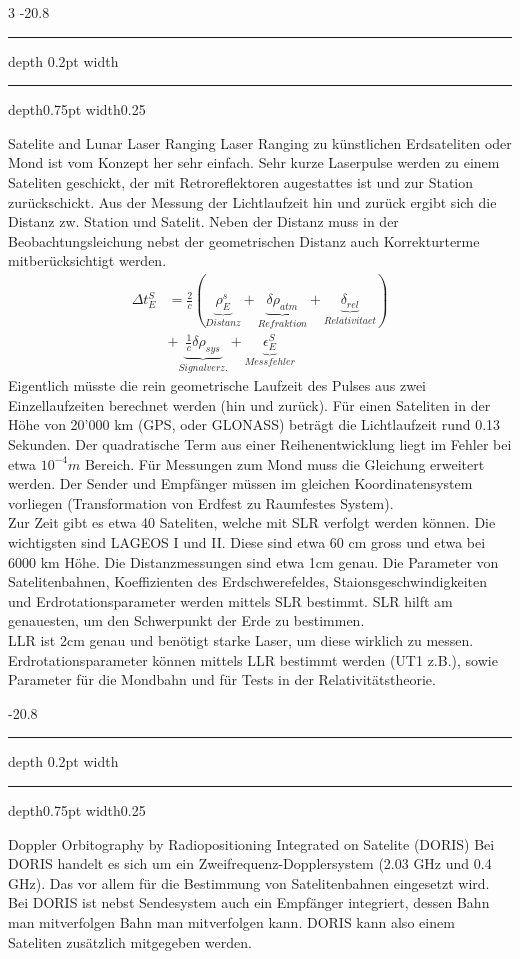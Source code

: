 \documentclass[9pt, landscape, fleqn]{scrartcl}
\makeatletter
\renewcommand{\subsection}{\@startsection{subsection}{1}{0mm}%
{-2\baselineskip}{0.8\baselineskip}%
{\hrule depth 0.2pt width\columnwidth\hrule depth0.75pt
width0.25\columnwidth\vspace*{1.2em}\large\bfseries\rmfamily}}
\makeatother
\begin{document}
\begin{multicols*}{3}
\subsection{Satelite and Lunar Laser Ranging}
Laser Ranging zu künstlichen Erdsateliten oder Mond ist vom Konzept her sehr einfach. Sehr kurze Laserpulse werden zu einem Sateliten geschickt, der mit Retroreflektoren augestattes ist und zur Station zurückschickt. Aus der Messung der Lichtlaufzeit hin und zurück ergibt sich die Distanz zw. Station und Satelit. Neben der Distanz muss in der Beobachtungsleichung nebst der geometrischen Distanz auch Korrekturterme mitberücksichtigt werden.
\begin{align*}
    \Delta t_E^S &= \frac{2}{c}\left( \underbrace{\rho_E^s}_{Distanz} + \underbrace{\delta \rho_{atm}}_{Refraktion} + \underbrace{\delta_{rel}}_{Relativitaet} \right)  \\
    &+ \underbrace{\frac{1}{c} \delta \rho_{sys}}_{Signalverz.}+ \underbrace{\epsilon_E^S}_{Messfehler}
\end{align*}
Eigentlich müsste die rein geometrische Laufzeit des Pulses aus zwei Einzellaufzeiten berechnet werden (hin und zurück). Für einen Sateliten in der Höhe von 20'000 km (GPS, oder GLONASS) beträgt die Lichtlaufzeit rund 0.13 Sekunden. Der quadratische Term aus einer Reihenentwicklung liegt im Fehler bei etwa $10^{-4}m$ Bereich. Für Messungen zum Mond muss die Gleichung erweitert werden. Der Sender und Empfänger müssen im gleichen Koordinatensystem vorliegen (Transformation von Erdfest zu Raumfestes System). \\

Zur Zeit gibt es etwa 40 Sateliten, welche mit SLR verfolgt werden können. Die wichtigsten sind LAGEOS I und II. Diese sind etwa 60 cm gross und etwa bei 6000 km Höhe. Die Distanzmessungen sind etwa 1cm genau. Die Parameter von Satelitenbahnen, Koeffizienten des Erdschwerefeldes, Staionsgeschwindigkeiten und Erdrotationsparameter werden mittels SLR bestimmt. SLR hilft am genauesten, um den Schwerpunkt der Erde zu bestimmen. \\

LLR ist 2cm genau und benötigt starke Laser, um diese wirklich zu messen. Erdrotationsparameter können mittels LLR bestimmt werden (UT1 z.B.), sowie Parameter für die Mondbahn und für Tests in der Relativitätstheorie.

\subsection{Doppler Orbitography by Radiopositioning Integrated on Satelite (DORIS)}
Bei DORIS handelt es sich um ein Zweifrequenz-Dopplersystem (2.03 GHz und 0.4 GHz). Das vor allem für die Bestimmung von Satelitenbahnen eingesetzt wird. Bei DORIS ist nebst Sendesystem auch ein Empfänger integriert, dessen Bahn man mitverfolgen Bahn man mitverfolgen kann. DORIS kann also einem Sateliten zusätzlich mitgegeben werden. \\


\end{multicols*}
\end{document}
